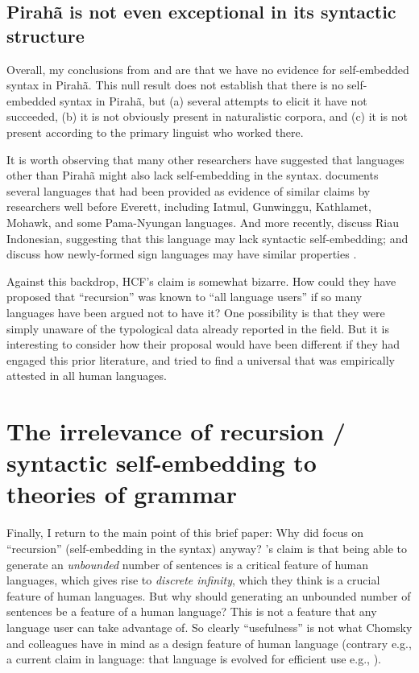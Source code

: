 \documentclass{article}
\begin{document}
\subsection{Pirahã is not even exceptional in its syntactic structure}

Overall, my conclusions from \cite{futrell2016corpus} and \cite{sauerland2018false} are that we have no evidence for self-embedded syntax in Pirahã. This null result does not establish that there is no self-embedded syntax in Pirahã, but (a) several attempts to elicit it have not succeeded, (b) it is not obviously present in naturalistic corpora, and (c) it is not present according to the primary linguist who worked there.

It is worth observing that many other researchers have suggested that languages other than Pirahã might also lack self-embedding in the syntax. \cite{pullum2023daniel} documents several languages that had been provided as evidence of similar claims by researchers well before Everett, including Iatmul, Gunwinggu, Kathlamet, Mohawk, and some Pama-Nyungan languages. And more recently, \cite{gil2009much, jackendoff2014what, gil2023hierarchical} discuss Riau Indonesian, suggesting that this language may lack syntactic self-embedding; and \cite{jackendoff2014what} discuss how newly-formed sign languages may have similar properties \citep{goldin2005resilience, sandler2005emergence}.

Against this backdrop, HCF's claim is somewhat bizarre. How could they have proposed that ``recursion'' was known to ``all language users'' if so many languages have been argued not to have it? One possibility is that they were simply unaware of the typological data already reported in the field. But it is interesting to consider how their proposal would have been different if they had engaged this prior literature, and tried to find a universal that was empirically attested in all human languages. 

\section{The irrelevance of recursion / syntactic self-embedding to theories of grammar}
\label{irrel_recursion_sec}

Finally,  I return to the main point of this brief paper: Why did \cite{hauser2002faculty} focus on ``recursion'' (self-embedding in the syntax) anyway?  \cite{hauser2002faculty}’s claim is that being able to generate an \textit{unbounded} number of sentences is a critical feature of human languages, which gives rise to \textit{discrete infinity}, which they think is a crucial feature of human languages.  But why should generating an unbounded number of sentences be a feature of a human language?  This is not a feature that any language user can take advantage of. So clearly ``usefulness'' is not what Chomsky and colleagues have in mind as a design feature of human language (contrary e.g., a current claim in language: that language is evolved for efficient use e.g., \cite{gibson2019efficiency}).
\end{document}
